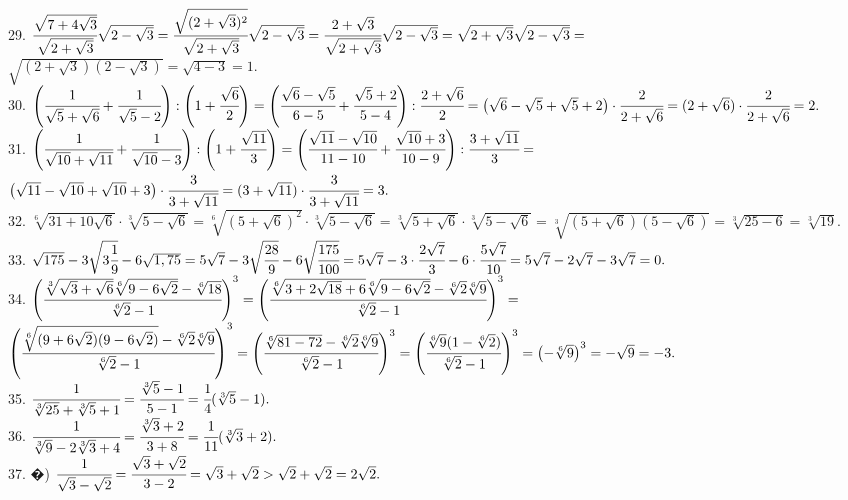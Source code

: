 \documentclass[12pt]{article}
\begin{document}
29. $\cfrac{\sqrt{7+4\sqrt{3}}}{\sqrt{2+\sqrt{3}}}\sqrt{2-\sqrt{3}}=
\cfrac{\sqrt{(2+\sqrt{3})^2}}{\sqrt{2+\sqrt{3}}}\sqrt{2-\sqrt{3}}=
\cfrac{2+\sqrt{3}}{\sqrt{2+\sqrt{3}}}\sqrt{2-\sqrt{3}}=\sqrt{2+\sqrt{3}}\sqrt{2-\sqrt{3}}=$\\$\sqrt{(2+\sqrt{3})(2-\sqrt{3})}=\sqrt{4-3}=1.$\\
30. $\left(\cfrac{1}{\sqrt{5}+\sqrt{6}}+\cfrac{1}{\sqrt{5}-2}\right):\left(1+\cfrac{\sqrt{6}}{2}\right)=
\left(\cfrac{\sqrt{6}-\sqrt{5}}{6-5}+\cfrac{\sqrt{5}+2}{5-4}\right):\cfrac{2+\sqrt{6}}{2}=
\left(\sqrt{6}-\sqrt{5}+\sqrt{5}+2\right)\cdot\cfrac{2}{2+\sqrt{6}}=(2+\sqrt{6})\cdot\cfrac{2}{2+\sqrt{6}}=2.$\\
31. $\left(\cfrac{1}{\sqrt{10}+\sqrt{11}}+\cfrac{1}{\sqrt{10}-3}\right):\left(1+\cfrac{\sqrt{11}}{3}\right)=
\left(\cfrac{\sqrt{11}-\sqrt{10}}{11-10}+\cfrac{\sqrt{10}+3}{10-9}\right):\cfrac{3+\sqrt{11}}{3}=$\\$
\left(\sqrt{11}-\sqrt{10}+\sqrt{10}+3\right)\cdot\cfrac{3}{3+\sqrt{11}}=
(3+\sqrt{11})\cdot\cfrac{3}{3+\sqrt{11}}=3.$\\
32. $\sqrt[6]{31+10\sqrt{6}}\cdot\sqrt[3]{5-\sqrt{6}}=\sqrt[6]{(5+\sqrt{6})^2}\cdot\sqrt[3]{5-\sqrt{6}}=\sqrt[3]{5+\sqrt{6}}\cdot\sqrt[3]{5-\sqrt{6}}=
\sqrt[3]{(5+\sqrt{6})(5-\sqrt{6})}=\sqrt[3]{25-6}=\sqrt[3]{19}.$\\
33. $\sqrt{175}-3\sqrt{3\cfrac{1}{9}}-6\sqrt{1,75}=5\sqrt{7}-3\sqrt{\cfrac{28}{9}}-6\sqrt{\cfrac{175}{100}}=
5\sqrt{7}-3\cdot\cfrac{2\sqrt{7}}{3}-6\cdot\cfrac{5\sqrt{7}}{10}=5\sqrt{7}-2\sqrt{7}-3\sqrt{7}=0.$\\
34. $\left(\cfrac{\sqrt[3]{\sqrt{3}+\sqrt{6}}\sqrt[6]{9-6\sqrt{2}}-\sqrt[6]{18}}{\sqrt[6]{2}-1}\right)^3=
\left(\cfrac{\sqrt[6]{3+2\sqrt{18}+6}\sqrt[6]{9-6\sqrt{2}}-\sqrt[6]{2}\sqrt[6]{9}}{\sqrt[6]{2}-1}\right)^3=$\\$
\left(\cfrac{\sqrt[6]{(9+6\sqrt{2})(9-6\sqrt{2})}-\sqrt[6]{2}\sqrt[6]{9}}{\sqrt[6]{2}-1}\right)^3=
\left(\cfrac{\sqrt[6]{81-72}-\sqrt[6]{2}\sqrt[6]{9}}{\sqrt[6]{2}-1}\right)^3=
\left(\cfrac{\sqrt[6]{9}(1-\sqrt[6]{2})}{\sqrt[6]{2}-1}\right)^3=
\left(-\sqrt[6]{9}\right)^3=-\sqrt{9}=-3.$\\
35. $\cfrac{1}{\sqrt[3]{25}+\sqrt[3]{5}+1}=\cfrac{\sqrt[3]{5}-1}{5-1}=\cfrac{1}{4}(\sqrt[3]{5}-1).$\\
36. $\cfrac{1}{\sqrt[3]{9}-2\sqrt[3]{3}+4}=\cfrac{\sqrt[3]{3}+2}{3+8}=\cfrac{1}{11}(\sqrt[3]{3}+2).$\\
37. �) $\cfrac{1}{\sqrt{3}-\sqrt{2}}=\cfrac{\sqrt{3}+\sqrt{2}}{3-2}=\sqrt{3}+\sqrt{2}>\sqrt{2}+\sqrt{2}=2\sqrt{2}.$\\
\end{document}
